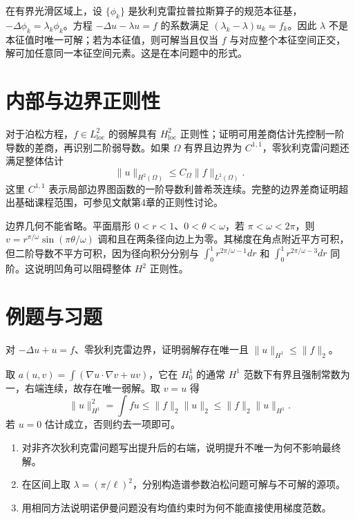 \documentclass[UTF8,12pt,a4paper,fontset=fandol]{ctexbook}
\begin{document}
在有界光滑区域上，设 $\{\phi_k\}$ 是狄利克雷拉普拉斯算子的规范本征基，$-\Delta\phi_k=\lambda_k\phi_k$。方程 $-\Delta u-\lambda u=f$ 的系数满足 $(\lambda_k-\lambda)u_k=f_k$。因此 $\lambda$ 不是本征值时唯一可解；若为本征值，则可解当且仅当 $f$ 与对应整个本征空间正交，解可加任意同一本征空间元素。这是在本问题中的形式。

\section{内部与边界正则性}
对于泊松方程，$f\in L^2_{\mathrm{loc}}$ 的弱解具有 $H^2_{\mathrm{loc}}$ 正则性；证明可用差商估计先控制一阶导数的差商，再识别二阶弱导数。如果 $\Omega$ 有界且边界为 $C^{1,1}$，零狄利克雷问题还满足整体估计
\[
 \|u\|_{H^2(\Omega)}\le C_\Omega\|f\|_{L^2(\Omega)}.
\]
这里 $C^{1,1}$ 表示局部边界图函数的一阶导数利普希茨连续。完整的边界差商证明超出基础课程范围，可参见文献\cite{hunter}第4章的正则性讨论。

边界几何不能省略。平面扇形 $0<r<1$、$0<\theta<\omega$，若 $\pi<\omega<2\pi$，则 $v=r^{\pi/\omega}\sin(\pi\theta/\omega)$ 调和且在两条径向边上为零。其梯度在角点附近平方可积，但二阶导数不平方可积，因为径向积分分别与 $\int_0^1r^{2\pi/\omega-1}dr$ 和 $\int_0^1r^{2\pi/\omega-3}dr$ 同阶。这说明凹角可以阻碍整体 $H^2$ 正则性。

\section{例题与习题}
\begin{example}
对 $-\Delta u+u=f$、零狄利克雷边界，证明弱解存在唯一且 $\|u\|_{H^1}\le\|f\|_2$。
\end{example}
\begin{solve}
取 $a(u,v)=\int(\nabla u\cdot\nabla v+uv)$，它在 $H_0^1$ 的通常 $H^1$ 范数下有界且强制常数为一，右端连续，故存在唯一弱解。取 $v=u$ 得
\[
 \|u\|_{H^1}^2=\int fu\le\|f\|_2\|u\|_2\le\|f\|_2\|u\|_{H^1}.
\]
若 $u=0$ 估计成立，否则约去一项即可。
\end{solve}
\begin{enumerate}
 \item 对非齐次狄利克雷问题写出提升后的右端，说明提升不唯一为何不影响最终解。
 \item 在区间上取 $\lambda=(\pi/\ell)^2$，分别构造谱参数泊松问题可解与不可解的源项。
 \item 用相同方法说明诺伊曼问题没有均值约束时为何不能直接使用梯度范数。
\end{enumerate}
\end{document}
